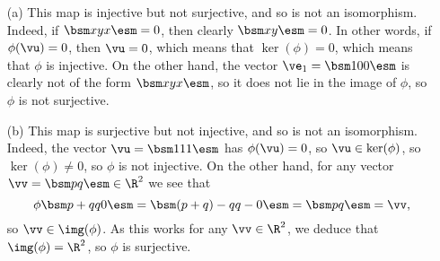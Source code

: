 \begin{solution}
 \begin{itemize}
  \item[(a)] This map is injective but not surjective, and
   so is not an isomorphism.  Indeed, if $\bsm x\\ y\\ x\esm=0$,
   then clearly $\bsm x\\ y\esm=0$.  In other words, if
   $\phi(\vu)=0$, then $\vu=0$, which means that
   $\ker(\phi)=0$, which means that $\phi$ is injective.  On
   the other hand, the vector $\ve_1=\bsm 1\\0\\0\esm$ is
   clearly not of the form $\bsm x\\ y\\ x\esm$, so it does
   not lie in the image of $\phi$, so $\phi$ is not
   surjective. 
  \item[(b)] This map is surjective but not injective, and
   so is not an isomorphism.   Indeed, the vector
   $\vu=\bsm 1\\ 1\\ 1 \esm$ has $\phi(\vu)=0$, so
   $\vu\in\ker(\phi)$, so $\ker(\phi)\neq 0$, so $\phi$ is
   not injective.  On the other hand, for any vector
   $\vv=\bsm p\\ q\esm\in\R^2$ we see that
   \[ \phi\bsm p+q\\q\\0\esm = 
       \bsm (p+q)-q \\ q-0 \esm = \bsm p\\ q\esm = \vv,
   \]
   so $\vv\in\img(\phi)$.  As this works for any
   $\vv\in\R^2$, we deduce that $\img(\phi)=\R^2$, so $\phi$
   is surjective. 


\end{itemize}
\end{solution}
